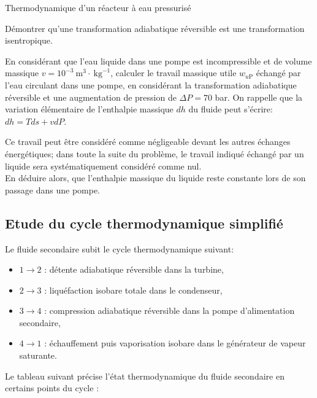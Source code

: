\begin{exo}[PC][1][devoir]{Thermodynamique d'un réacteur à eau pressurisé}
\begin{quest}
\item Démontrer qu'une transformation adiabatique réversible est une transformation isentropique.

\item En considérant que l'eau liquide dans une pompe est incompressible et de volume massique $v=10^{-3} \mathrm{~m}^{3} \cdot \mathrm{~kg}^{-1}$, calculer le travail massique utile $w_{u \mathrm{P}}$ échangé par l'eau circulant dans une pompe, en considérant la transformation adiabatique réversible et une augmentation de pression de $\Delta P=70$ bar. On rappelle que la variation élémentaire de l'enthalpie massique $d h$ du fluide peut s'écrire: $d h=T  d s+v  d P$.

Ce travail peut être considéré comme négligeable devant les autres échanges énergétiques; dans toute la suite du problème, le travail indiqué échangé par un liquide sera systématiquement considéré comme nul.\\
En déduire alors, que l'enthalpie massique du liquide reste constante lors de son passage dans une pompe.

\subsection{Etude du cycle thermodynamique simplifié}
Le fluide secondaire subit le cycle thermodynamique suivant:

\begin{itemize}
  \item $1 \rightarrow 2$ : détente adiabatique réversible dans la turbine,
  \item $2 \rightarrow 3$ : liquéfaction isobare totale dans le condenseur,
  \item $3 \rightarrow 4$ : compression adiabatique réversible dans la pompe d'alimentation secondaire,
  \item $4 \rightarrow 1$ : échauffement puis vaporisation isobare dans le générateur de vapeur saturante.
\end{itemize}

Le tableau suivant précise l'état thermodynamique du fluide secondaire en certains points du cycle :
\begin{center}
  

\end{center}
\end{quest}
\end{exo}
